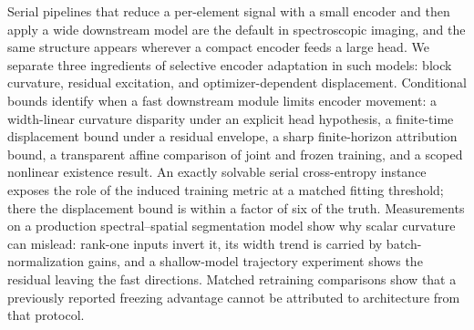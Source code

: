 Serial pipelines that reduce a per-element signal with a small encoder and
then apply a wide downstream model are the default in spectroscopic imaging,
and the same structure appears wherever a compact encoder feeds a large head.
We separate three ingredients of selective encoder adaptation in such models:
block curvature, residual excitation, and optimizer-dependent displacement.
Conditional bounds identify when a fast downstream module limits encoder
movement: a width-linear curvature disparity under an explicit head
hypothesis, a finite-time displacement bound under a residual envelope, a
sharp finite-horizon attribution bound, a transparent affine comparison of
joint and frozen training, and a scoped nonlinear existence result. An
exactly solvable serial cross-entropy instance exposes the role of the induced
training metric at a matched fitting threshold; there the displacement bound
is within a factor of six of the truth. Measurements on a production
spectral--spatial segmentation model show why scalar curvature can mislead:
rank-one inputs invert it, its width trend is carried by batch-normalization
gains, and a shallow-model trajectory experiment shows the residual leaving
the fast directions. Matched retraining comparisons show that a previously
reported freezing advantage cannot be attributed to architecture from that
protocol.
